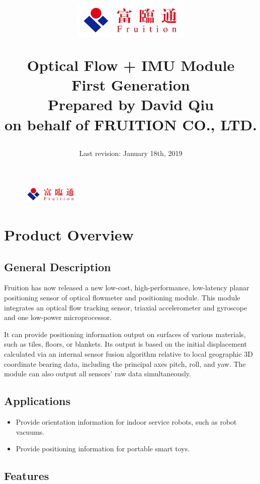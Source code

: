 \documentclass{scrreprt}
\title{
	\begin{figure}[H]
		\centering\includegraphics[width=0.5\textwidth]{logo.jpeg}
	\end{figure}
	\vspace{1cm}
	\flushright
	\Huge{Optical Flow + IMU Module}\\
	\vspace{2cm}
	\huge{First Generation}\\
	\vspace{2cm}
	\LARGE{Prepared by David Qiu \\ on behalf of FRUITION CO., LTD.}
}
\date{
	Last revision: January 18th, 2019\\
}
\newcommand{\pchapter}[1]{
	\begingroup\let\clearpage\relax
	\newpage
	\begin{figure}[H]
		\includegraphics[width=0.25\textwidth]{logo.jpeg}
	\end{figure}
	\chapter{#1}
	\endgroup
}
\begin{document}
\begin{CJK*}{UTF8}{gbsn}
\maketitle
\tableofcontents

\pchapter{Product Overview}

\section{General Description}

Fruition has now released a new low-cost, high-performance, low-latency planar
positioning sensor of optical flowmeter and positioning module. This module
integrates an optical flow tracking sensor, triaxial accelerometer and gyroscope
and one low-power microprocessor.

It can provide positioning information output on surfaces of various materials,
such as tiles, floors, or blankets. Its output is based on the initial
displacement calculated via an internal sensor fusion algorithm relative to
local geographic 3D coordinate bearing data, including the principal axes pitch,
roll, and yaw. The module can also output all sensors' raw data simultaneously.

\section{Applications}

\begin{itemize}
\item Provide orientation information for indoor service robots, such as robot vacuums.
\item Provide positioning information for portable smart toys.
\end{itemize}

\section{Features}


\end{CJK*}
\end{document}
